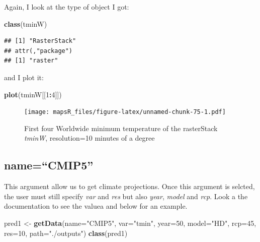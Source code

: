 \documentclass[]{report}
\newenvironment{Shaded}{\begin{snugshade}}{\end{snugshade}}
\newcommand{\DataTypeTok}[1]{\textcolor[rgb]{0.13,0.29,0.53}{#1}}
\newcommand{\DecValTok}[1]{\textcolor[rgb]{0.00,0.00,0.81}{#1}}
\newcommand{\KeywordTok}[1]{\textcolor[rgb]{0.13,0.29,0.53}{\textbf{#1}}}
\newcommand{\NormalTok}[1]{#1}
\newcommand{\OperatorTok}[1]{\textcolor[rgb]{0.81,0.36,0.00}{\textbf{#1}}}
\newcommand{\StringTok}[1]{\textcolor[rgb]{0.31,0.60,0.02}{#1}}
\begin{document}
Again, I look at the type of object I got:

\begin{Shaded}
\begin{Highlighting}[]
\KeywordTok{class}\NormalTok{(tminW)}
\end{Highlighting}
\end{Shaded}

\begin{verbatim}
## [1] "RasterStack"
## attr(,"package")
## [1] "raster"
\end{verbatim}

and I plot it:

\begin{Shaded}
\begin{Highlighting}[]
\KeywordTok{plot}\NormalTok{(tminW[[}\DecValTok{1}\OperatorTok{:}\DecValTok{4}\NormalTok{]])}
\end{Highlighting}
\end{Shaded}

\begin{figure}
\centering
\texttt{[image: mapsR\_files/figure-latex/unnamed-chunk-75-1.pdf]}
\caption{First four Worldwide minimum temperature of the rasterStack
\emph{tminW}, resolution=10 minutes of a degree}
\end{figure}

\hypertarget{namecmip5}{%
\subsection{name=``CMIP5''}\label{namecmip5}}

This argument allow us to get climate projections. Once this argument is
selcted, the user must still specify \emph{var} and \emph{res} but also
\emph{year}, \emph{model} and \emph{rcp}. Look a the documentation to
see the valuea and below for an example.

\begin{Shaded}
\begin{Highlighting}[]
\NormalTok{pred1 <-}\StringTok{ }\KeywordTok{getData}\NormalTok{(}\DataTypeTok{name=}\StringTok{"CMIP5"}\NormalTok{, }\DataTypeTok{var=}\StringTok{"tmin"}\NormalTok{, }\DataTypeTok{year=}\DecValTok{50}\NormalTok{, }\DataTypeTok{model=}\StringTok{"HD"}\NormalTok{, }\DataTypeTok{rcp=}\DecValTok{45}\NormalTok{, }\DataTypeTok{res=}\DecValTok{10}\NormalTok{, }\DataTypeTok{path=}\StringTok{"./outputs"}\NormalTok{)}
\KeywordTok{class}\NormalTok{(pred1)}
\end{Highlighting}
\end{Shaded}
\end{document}

